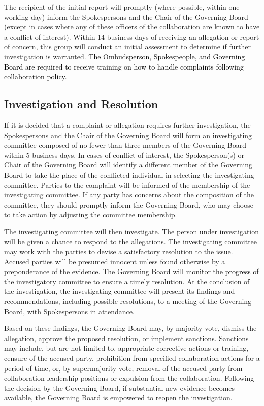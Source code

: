 \documentclass[12pt]{article}
\newcommand{\todo}[1]{\textcolor{red}{(TODO: #1)}}
\newcommand{\rev}[1]{\textcolor{black}{#1}}
\begin{document}
The recipient of the initial report will promptly (where possible, within one working day) inform the Spokespersons and the Chair of the Governing Board (except in cases where any of these officers of the collaboration are known to have a conflict of interest). Within 14 business days of receiving an allegation or report of concern, this group will conduct an initial assessment to determine if further investigation is warranted. \rev{The Ombudsperson, Spokespeople, and Governing Board are required to receive training on how to handle complaints following collaboration policy.} 



\subsection{Investigation and Resolution}

If it is decided that a complaint or allegation requires further investigation, the Spokespersons and the Chair of the Governing Board will form an investigating committee composed of no fewer than three members of the Governing Board within 5 business days. In cases of conflict of interest, the Spokesperson(s) or Chair of the Governing Board will identify a different member of the Governing Board to take the place of the conflicted individual in selecting the investigating committee. Parties to the complaint will be informed of the membership of the investigating committee. If any party has concerns about the composition of the committee, they should promptly inform the Governing Board, who may choose to take action by adjusting the committee membership.

The investigating committee will then investigate. The person under investigation will be given a chance to respond to the allegations.  The investigating committee may work with the parties to devise a satisfactory resolution to the issue.  Accused parties will be presumed innocent unless found otherwise by a preponderance of the evidence. The Governing Board will \rev{monitor the progress of} the investigatory committee to ensure a timely resolution. At the conclusion of the investigation, the investigating committee will present its findings and recommendations, including possible resolutions, to a meeting of the Governing Board, with Spokespersons in attendance. 

Based on these findings, the Governing Board may, by majority vote, dismiss the allegation, approve the proposed resolution, or implement sanctions.  Sanctions may include, but are not limited to, appropriate corrective actions or training, censure of the accused party, prohibition from specified collaboration actions for a period of time, or, by supermajority vote, removal of the accused party from collaboration leadership positions or expulsion from the collaboration. Following the decision by the Governing Board, if substantial new evidence becomes available, the Governing Board is empowered to reopen the investigation.
 
\end{document}
